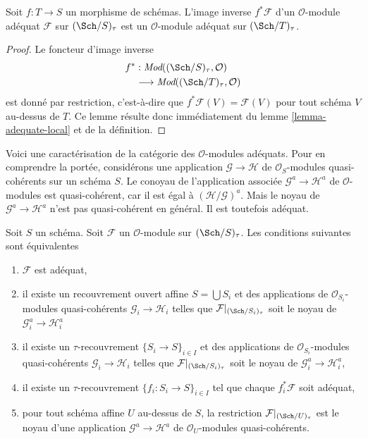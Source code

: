 \begin{lemma}
\label{lemma-pullback-adequate}
Soit $f : T \to S$ un morphisme de schémas.
L'image inverse $f^*\mathcal{F}$ d'un $\mathcal{O}$-module adéquat
$\mathcal{F}$ sur $(\Sch/S)_\tau$ est un
$\mathcal{O}$-module adéquat sur $(\Sch/T)_\tau$.
\end{lemma}

\begin{proof}
Le foncteur d'image inverse
$$
\begin{aligned}
f^* & : \textit{Mod}((\Sch/S)_\tau, \mathcal{O}) \\
& \longrightarrow \textit{Mod}((\Sch/T)_\tau, \mathcal{O})
\end{aligned}
$$
est donné par restriction, c'est-à-dire que $f^*\mathcal{F}(V) = \mathcal{F}(V)$
pour tout schéma $V$ au-dessus de $T$. Ce lemme résulte donc immédiatement du
lemme \ref{lemma-adequate-local}
et de la définition.
\end{proof}

\noindent
Voici une caractérisation de la catégorie des $\mathcal{O}$-modules adéquats.
Pour en comprendre la portée, considérons une application $\mathcal{G} \to \mathcal{H}$
de $\mathcal{O}_S$-modules quasi-cohérents sur un schéma $S$.
Le conoyau de l'application associée $\mathcal{G}^a \to \mathcal{H}^a$
de $\mathcal{O}$-modules est quasi-cohérent, car il est égal à
$(\mathcal{H}/\mathcal{G})^a$. Mais le noyau de
$\mathcal{G}^a \to \mathcal{H}^a$ n'est pas quasi-cohérent
en général. Il est toutefois adéquat.

\begin{lemma}
\label{lemma-adequate-characterize}
Soit $S$ un schéma. Soit $\mathcal{F}$ un $\mathcal{O}$-module sur
$(\Sch/S)_\tau$. Les conditions suivantes sont équivalentes
\begin{enumerate}
\item $\mathcal{F}$ est adéquat,
\item il existe un recouvrement ouvert affine $S = \bigcup S_i$ et des
applications de $\mathcal{O}_{S_i}$-modules quasi-cohérents
$\mathcal{G}_i \to \mathcal{H}_i$
telles que $\mathcal{F}|_{(\Sch/S_i)_\tau}$ soit le
noyau de $\mathcal{G}_i^a \to \mathcal{H}_i^a$
\item il existe un $\tau$-recouvrement $\{S_i \to S\}_{i \in I}$ et des
applications de $\mathcal{O}_{S_i}$-modules quasi-cohérents
$\mathcal{G}_i \to \mathcal{H}_i$
telles que $\mathcal{F}|_{(\Sch/S_i)_\tau}$ soit le
noyau de $\mathcal{G}_i^a \to \mathcal{H}_i^a$,
\item il existe un $\tau$-recouvrement $\{f_i : S_i \to S\}_{i \in I}$
tel que chaque $f_i^*\mathcal{F}$ soit adéquat,
\item pour tout schéma affine $U$ au-dessus de $S$, la restriction
$\mathcal{F}|_{(\Sch/U)_\tau}$ est le noyau
d'une application $\mathcal{G}^a \to \mathcal{H}^a$ de
$\mathcal{O}_U$-modules quasi-cohérents.
\end{enumerate}
\end{lemma}

